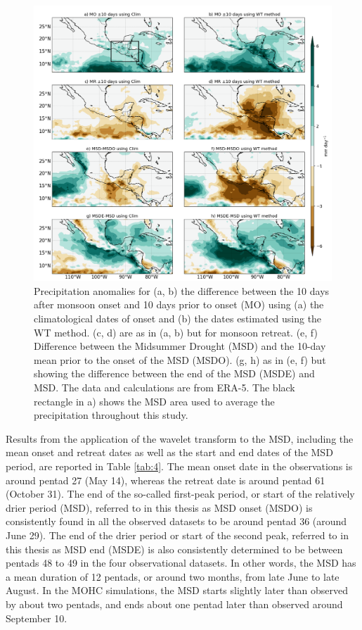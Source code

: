 \begin{figure}[t!]
\centering
 \includegraphics[width=0.95\linewidth]{figures/wav_fig10.png}
\caption[Precipitation anomalies after MSD]{  Precipitation anomalies for (a, b) the difference between the 10 days after monsoon onset and 10 days prior to onset (MO) using (a) the climatological dates of onset and (b) the dates estimated using the WT method. (c, d) are as in (a, b) but for monsoon retreat. (e, f) Difference between the Midsummer Drought (MSD) and the 10-day mean prior to the onset of the MSD (MSDO). (g, h) as in (e, f) but showing the difference between the end of the MSD (MSDE) and MSD. The data and calculations are from ERA-5. The black rectangle in a) shows the MSD area used to average the precipitation throughout this study.}
\label{fig:wav_fig11}
\end{figure}

Results from the application of the wavelet transform to the MSD, including the mean onset and retreat dates as well as the start and end dates of the MSD period, are reported in Table \ref{tab:4}.
The mean onset date in the observations is around pentad 27 (May 14), whereas the retreat date is around pentad 61 (October 31).
The end of the so-called first-peak period, or start of the relatively drier period (MSD), referred to in this thesis as MSD onset (MSDO) is consistently found in all the observed datasets to be around pentad 36 (around June 29).
The end of the drier period or start of the second peak, referred to in this thesis as MSD end (MSDE) is also consistently determined to be between pentads 48 to 49 in the four observational datasets.
In other words, the MSD has a mean duration of 12 pentads, or around two months, from late June to late August.
In the MOHC simulations, the MSD starts slightly later than observed by about two pentads, and ends about one pentad later than observed around September 10.

